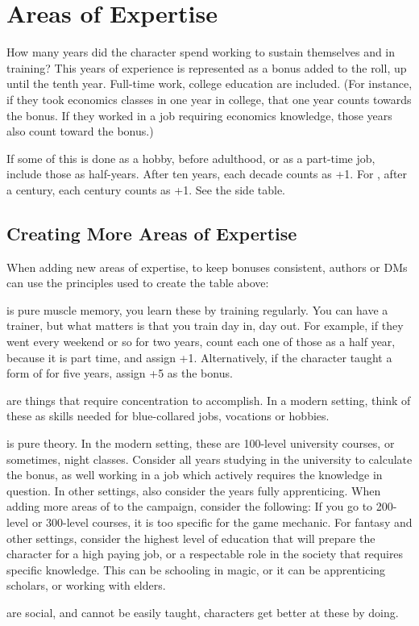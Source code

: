 \section{Areas of Expertise}

\label{subsec:areas_of_expertise}

How many years did the character spend working to sustain themselves and in training?
This years of experience is represented as a bonus added to the roll, up until the tenth year.
Full-time work, college education are included.
(For instance, if they took economics classes in one year in college, that one year counts towards the bonus.
If they worked in a job requiring economics knowledge, those years also count toward the bonus.)

If some of this is done as a hobby, before adulthood, or as a part-time job, include those as half-years.
After ten years, each decade counts as +1. For ,
after a century, each century counts as +1. See the side table.

\subsection{Creating More Areas of Expertise}

When adding new areas of expertise, to keep bonuses consistent,
authors or DMs can use the principles used to create the table above:

 is pure muscle memory, you learn these by training regularly.
You can have a trainer, but what matters is that you train day in, day out.
For example, if they went  every weekend or so for two years, count each one of those as a half year, because it is part time, and assign +1.
Alternatively, if the character taught a form of  for five years, assign +5 as the bonus.\par

 are things that require concentration to accomplish.
In a modern setting, think of these as skills needed for blue-collared jobs, vocations or hobbies.

 is pure theory.
In the modern setting, these are 100-level university courses, or sometimes, night classes.
Consider all years studying in the university to calculate the bonus, as well working in a job which actively requires the knowledge in question.
In other settings, also consider the years fully apprenticing.
When adding more areas of  to the campaign, consider the following:
If you go to 200-level or 300-level courses, it is too specific for the game mechanic.
For fantasy and other settings, consider the highest level of
education that will prepare the character for a high paying job, or a respectable role in the society that requires specific knowledge.
This can be schooling in magic, or it can be apprenticing scholars, or working with elders.
\par
{} are social, and cannot be easily taught, characters get better at these by doing.\par

